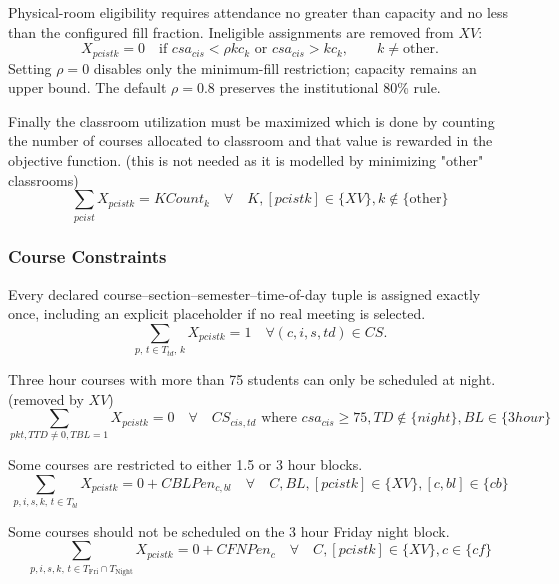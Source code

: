 \documentclass[11pt, oneside]{article}   	%
\begin{document}
Physical-room eligibility requires attendance no greater than capacity and no
less than the configured fill fraction. Ineligible assignments are removed
from $XV$:
\begin{equation}
	X_{pcistk}=0 \quad\text{if } csa_{cis}<\rho kc_k
	\text{ or }csa_{cis}>kc_k,\qquad k\ne\text{other}.
\end{equation}
Setting $\rho=0$ disables only the minimum-fill restriction; capacity remains
an upper bound. The default $\rho=0.8$ preserves the institutional 80\% rule.

Finally the classroom utilization must be maximized which is done by counting the number of courses
allocated to classroom and that value is rewarded in the objective function. (this is not needed as it is modelled by minimizing "other" classrooms)
\begin{equation}
	\sum_{pcist} X_{pcistk} = KCount_{k} \quad \forall \quad K, 
	[pcistk] \in \{ XV \}, k \not \in \{ \text{other} \}
\end{equation}


\subsubsection{Course Constraints}
Every declared course--section--semester--time-of-day tuple is assigned exactly once,
including an explicit placeholder if no real meeting is selected.
\begin{equation}
	\sum_{p,\,t\in T_{td},\,k} X_{pcistk} = 1
	\quad \forall(c,i,s,td)\in CS.
\end{equation}

Three hour courses with more than 75 students can only be scheduled at night. (removed by $XV$)
\begin{equation}
	\sum_{pkt, TTD \ne 0, TBL = 1} X_{pcistk} = 0 \quad \forall \quad CS_{cis,td} \text{ where } csa_{cis} \ge 75, TD \not \in \{night \},  BL \in \{ 3hour \}
\end{equation}

Some courses are restricted to either 1.5 or 3 hour blocks.
\begin{equation}
	\sum_{p,i,s,k,\, t \in T_{bl}} X_{pcistk} = 0 + CBLPen_{c,bl} \quad \forall \quad C, BL, 
	[pcistk] \in \{ XV \}, [c,bl] \in \{ cb \}
\end{equation}

Some courses should not be scheduled on the 3 hour Friday night block.
\begin{equation}
	\sum_{p,i,s,k,\, t \in T_{\text{Fri}} \cap T_{\text{Night}}} X_{pcistk} = 0 + CFNPen_{c} 
	\quad \forall \quad C, [pcistk] \in \{ XV \}, c \in \{ cf \}
\end{equation}
\end{document}
